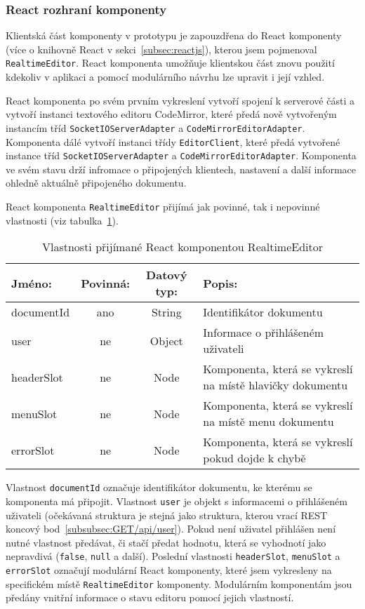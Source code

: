 
\subsubsection{React rozhraní komponenty}

Klientská část komponenty v prototypu je zapouzdřena do React komponenty (více o knihovně React v sekci~\ref{subsec:reactjs}), kterou jsem pojmenoval \texttt{RealtimeEditor}.
React komponenta umožňuje klientskou část znovu použití kdekoliv v aplikaci a pomocí modulárního návrhu lze upravit i její vzhled.

React komponenta po svém prvním vykreslení vytvoří spojení k serverové části a vytvoří instanci textového editoru CodeMirror, které předá nově vytvořeným instancím tříd \texttt{SocketIOServerAdapter} a \texttt{CodeMirrorEditorAdapter}.
Komponenta dálé vytvoří instanci třídy \texttt{EditorClient}, které předá vytvořené instance tříd \texttt{SocketIOServerAdapter} a \texttt{CodeMirrorEditorAdapter}.
Komponenta ve svém stavu drží infromace o připojených klientech, nastavení a další informace ohledně aktuálně připojeného dokumentu.

React komponenta \texttt{RealtimeEditor} přijímá jak povinné, tak i nepovinné vlastnosti (viz tabulka~\ref{tab:reactKomponenta}).

\begin{table}[ht!]\centering
\caption{Vlastnosti přijímané React komponentou RealtimeEditor}\label{tab:reactKomponenta}

\begin{tabular}{l c c p{5.5cm}}
    Jméno: & Povinná: & Datový typ: & Popis:\\ \hline
    documentId & ano & String & Identifikátor dokumentu\\ \hline
    user & ne & Object & Informace o přihlášeném uživateli\\ \hline
    headerSlot & ne & Node & Komponenta, která se vykreslí na místě hlavičky dokumentu \\ \hline
    menuSlot & ne & Node & Komponenta, která se vykreslí na místě menu dokumentu \\ \hline
    errorSlot & ne & Node & Komponenta, která se vykreslí pokud dojde k chybě \\
\end{tabular}
\end{table}

Vlastnost \texttt{documentId} označuje identifikátor dokumentu, ke kterému se komponenta má připojit.
Vlastnost \texttt{user} je objekt s informacemi o přihlášeném uživateli (očekávaná struktura je stejná jako struktura, kterou vrací \gls{REST} koncový bod~\ref{subsubsec:GET/api/user}).
Pokud není uživatel přihlášen není nutné vlastnost předávat, či stačí předat hodnotu, která se vyhodnotí jako nepravdivá (\texttt{false}, \texttt{null} a další).
Poslední vlastnosti \texttt{headerSlot}, \texttt{menuSlot} a \texttt{errorSlot} označují modulární React komponenty, které jsem vykresleny na specifickém místě \texttt{RealtimeEditor} komponenty.
Modulárním komponentám jsou předány vnitřní informace o stavu editoru pomocí jejich vlastností.

